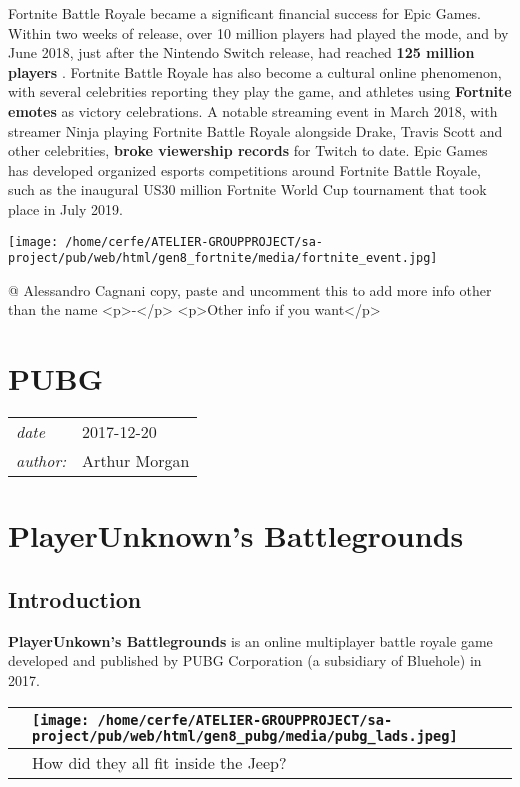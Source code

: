 \documentclass[a4paper,10pt]{book}
\newcommand{\pageHeader}[4]{
    \section{#1}
    \vspace{-0.3cm}
    \begin{table}[h!]
     \begin{tabular}{ll}
        \hline
        \textit{date} & #2 \\
        \textit{author: } & #3\\
        \hline
     \end{tabular}
    \end{table}
    \vspace{-0.3cm}
}
\begin{document}
 
          Fortnite Battle Royale became a significant financial success for Epic Games. Within two weeks of release, over 10 million players had played the mode, and by June 2018, just after the Nintendo Switch
          release, had reached  \textbf{125 million players } . Fortnite Battle Royale has also become a cultural online phenomenon, with several celebrities reporting they play the game, and athletes using  \textbf{Fortnite emotes } 
          as victory celebrations. A notable streaming event in March 2018, with streamer Ninja playing Fortnite Battle Royale alongside Drake, Travis Scott and other celebrities,  \textbf{broke viewership records }  for Twitch
          to date. Epic Games has developed organized esports competitions around Fortnite Battle Royale, such as the inaugural US30 million Fortnite World Cup tournament that took place in July 2019.
         
 
 \texttt{[image: /home/cerfe/ATELIER-GROUPPROJECT/sa-project/pub/web/html/gen8\_fortnite/media/fortnite\_event.jpg]}
 
 
 @ Alessandro Cagnani 
  copy, paste and uncomment this to add more info other than the name
            <p>-</p>
            <p>Other info if you want</p>
           
 
 
 \newpage\pageHeader{PUBG}{2017-12-20}{Arthur Morgan}{The game that brought battle royale to the mainstream, PlayerUnknown's Battlegrounds}
 \section{PlayerUnknown's Battlegrounds }
 \subsection{Introduction }
 
 \textbf{PlayerUnkown's Battlegrounds }  is an online multiplayer battle royale game developed and published by PUBG Corporation (a subsidiary of Bluehole) in 2017.
         
 \begin{longtable}{p{1mm}|l|}\hline
 
 & \texttt{[image: /home/cerfe/ATELIER-GROUPPROJECT/sa-project/pub/web/html/gen8\_pubg/media/pubg\_lads.jpeg]}
 \\\hline
 
 & How did they all fit inside the Jeep? 
 \\\hline
 \end{longtable}
 
\end{document}
